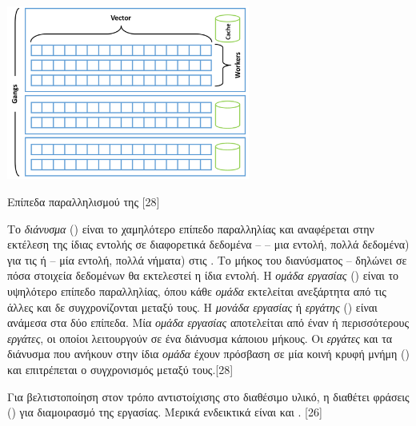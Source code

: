 \begin{Illustration}[!h] 
	\centering
	\includegraphics[width=0.6\textwidth]{images/image059.png} 
	\caption{Επίπεδα παραλληλισμού της  [28]}
	\label{image-3.16}
\end{Illustration}


Το \textit{διάνυσμα} () είναι το χαμηλότερο επίπεδο παραλληλίας και αναφέρεται στην εκτέλεση της ίδιας εντολής σε διαφορετικά δεδομένα –  – μια εντολή, πολλά δεδομένα) για τις  ή  – μία εντολή, πολλά νήματα) στις . Το μήκος του διανύσματος –  δηλώνει σε πόσα στοιχεία δεδομένων θα εκτελεστεί η ίδια εντολή. Η \textit{ομάδα εργασίας} () είναι το υψηλότερο επίπεδο παραλληλίας, όπου κάθε \textit{ομάδα} εκτελείται ανεξάρτητα από τις άλλες και δε συγχρονίζονται μεταξύ τους. Η \textit{μονάδα εργασίας }ή\textit{ εργάτης} () είναι ανάμεσα στα δύο επίπεδα. Μία \textit{ομάδα εργασίας} αποτελείται από έναν ή περισσότερους \textit{εργάτες}, οι οποίοι λειτουργούν σε ένα διάνυσμα κάποιου μήκους. Οι \textit{εργάτες} και τα διάνυσμα που ανήκουν στην ίδια \textit{ομάδα} έχουν πρόσβαση σε μία κοινή κρυφή μνήμη () και επιτρέπεται ο συγχρονισμός μεταξύ τους.[28]

Για βελτιστοποίηση στον τρόπο αντιστοίχισης στο διαθέσιμο υλικό, η  διαθέτει φράσεις () για διαμοιρασμό της εργασίας. Μερικά ενδεικτικά είναι και . [26]
